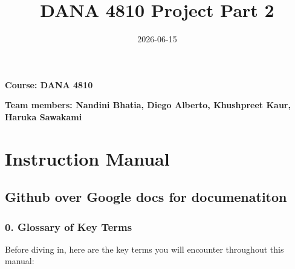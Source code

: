 \documentclass[
]{article}
\title{DANA 4810 Project Part 2}
\author{}
\date{\vspace{-2.5em}2026-06-15}
\begin{document}
\maketitle

{
\setcounter{tocdepth}{3}
\tableofcontents
}
\textbf{Course: DANA 4810}

\textbf{Team members: Nandini Bhatia, Diego Alberto, Khushpreet Kaur,
Haruka Sawakami}

\section{Instruction Manual}\label{instruction-manual}

\subsection{Github over Google docs for
documenatiton}\label{github-over-google-docs-for-documenatiton}

\subsubsection{0. Glossary of Key Terms}\label{glossary-of-key-terms}

Before diving in, here are the key terms you will encounter throughout
this manual:
\end{document}
